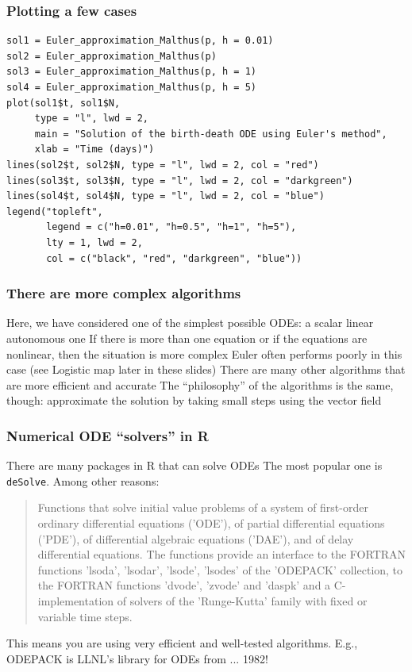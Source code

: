 \documentclass[aspectratio=169]{beamer}
\begin{document}
\begin{frame}[fragile]\frametitle{Plotting a few cases}
\begin{lstlisting}
sol1 = Euler_approximation_Malthus(p, h = 0.01)
sol2 = Euler_approximation_Malthus(p)
sol3 = Euler_approximation_Malthus(p, h = 1)
sol4 = Euler_approximation_Malthus(p, h = 5)
plot(sol1$t, sol1$N,
     type = "l", lwd = 2,
     main = "Solution of the birth-death ODE using Euler's method",
     xlab = "Time (days)")
lines(sol2$t, sol2$N, type = "l", lwd = 2, col = "red")
lines(sol3$t, sol3$N, type = "l", lwd = 2, col = "darkgreen")
lines(sol4$t, sol4$N, type = "l", lwd = 2, col = "blue")
legend("topleft",
       legend = c("h=0.01", "h=0.5", "h=1", "h=5"),
       lty = 1, lwd = 2,
       col = c("black", "red", "darkgreen", "blue"))
\end{lstlisting}
\end{frame}


\begin{frame}\frametitle{There are more complex algorithms}
Here, we have considered one of the simplest possible ODEs: a scalar linear autonomous one
\vfill
If there is more than one equation or if the equations are nonlinear, then the situation is more complex
\vfill
Euler often performs poorly in this case (see Logistic map later in these slides)
\vfill
There are many other algorithms that are more efficient and accurate
\vfill
The ``philosophy'' of the algorithms is the same, though: approximate the solution by taking small steps using the vector field
\end{frame}

\begin{frame}\frametitle{Numerical ODE ``solvers'' in R}
There are many packages in R that can solve ODEs
\vfill
The most popular one is \texttt{deSolve}. Among other reasons:
\vfill
\begin{quote}
Functions that solve initial value problems of a system of first-order ordinary differential equations ('ODE'), of partial differential equations ('PDE'), of differential algebraic equations ('DAE'), and of delay differential equations. The functions provide an interface to the FORTRAN functions 'lsoda', 'lsodar', 'lsode', 'lsodes' of the 'ODEPACK' collection, to the FORTRAN functions 'dvode', 'zvode' and 'daspk' and a C-implementation of solvers of the 'Runge-Kutta' family with fixed or variable time steps.
\end{quote}
\vfill
This means you are using very efficient and well-tested algorithms. E.g., ODEPACK is LLNL's library for ODEs from ... 1982!
\end{frame}
\end{document}
